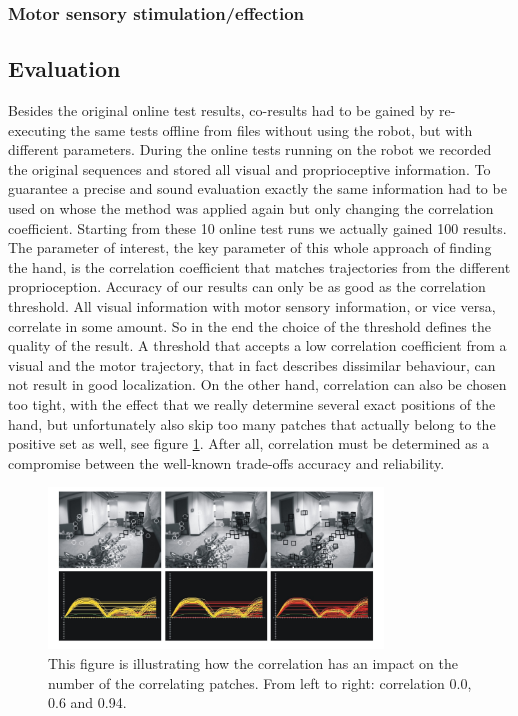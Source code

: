 \subsubsection{Motor sensory stimulation/effection}\label{results:motosensstim}

%
%
\subsection{Evaluation}\label{results:evaluation}
Besides the original online test results, co-results had to be gained by re-executing the same tests offline from files without using the robot, but with different parameters. During the online tests running on the robot we recorded the original sequences and stored all visual and proprioceptive information. To guarantee a precise and sound evaluation exactly the same information had to be used on whose the method was applied again but only changing the correlation coefficient. Starting from these 10 online test runs we actually gained 100 results. The parameter of interest, the key parameter of this whole approach of finding the hand, is the correlation coefficient that matches trajectories from the different proprioception. Accuracy of our results can only be as good as the correlation threshold. All visual information with motor sensory information, or vice versa, correlate in some amount. So in the end the choice of the threshold defines the quality of the result. A threshold that accepts a low correlation coefficient from a visual and the motor trajectory, that in fact describes dissimilar behaviour, can not result in good localization. On the other hand, correlation can also be chosen too tight, with the effect that we really determine several exact positions of the hand, but unfortunately also skip too many patches that actually belong to the positive set as well, see figure \ref{fig:impactofcorr}. After all, correlation must be determined as a compromise between the well-known trade-offs accuracy and reliability.
%
\begin{figure}
	\begin{center}
		\includegraphics[width=3.5in]{imgs/results/impactofcorr.pdf}
			\caption[Varying the correlation threshold.]{ This figure is illustrating how the correlation has an impact on the number of the correlating patches. From left to right: correlation 0.0, 0.6 and 0.94. }
			\label{fig:impactofcorr}
	\end{center}
\end{figure}
%
